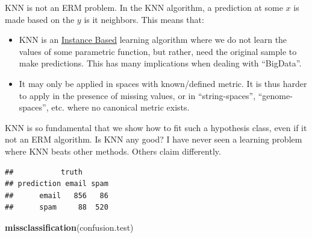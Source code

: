 \documentclass[]{book}
\newenvironment{Shaded}{\begin{snugshade}}{\end{snugshade}}
\newcommand{\KeywordTok}[1]{\textcolor[rgb]{0.13,0.29,0.53}{\textbf{#1}}}
\newcommand{\DataTypeTok}[1]{\textcolor[rgb]{0.13,0.29,0.53}{#1}}
\newcommand{\DecValTok}[1]{\textcolor[rgb]{0.00,0.00,0.81}{#1}}
\newcommand{\StringTok}[1]{\textcolor[rgb]{0.31,0.60,0.02}{#1}}
\newcommand{\CommentTok}[1]{\textcolor[rgb]{0.56,0.35,0.01}{\textit{#1}}}
\newcommand{\OperatorTok}[1]{\textcolor[rgb]{0.81,0.36,0.00}{\textbf{#1}}}
\newcommand{\NormalTok}[1]{#1}
\providecommand{\tightlist}{%
  \setlength{\itemsep}{0pt}\setlength{\parskip}{0pt}}
\theoremstyle{definition}
\theoremstyle{definition}
\theoremstyle{definition}
\theoremstyle{remark}
\begin{document}
KNN is not an ERM problem. In the KNN algorithm, a prediction at some
\(x\) is made based on the \(y\) is it neighbors. This means that:

\begin{itemize}
\tightlist
\item
  KNN is an
  \href{https://en.wikipedia.org/wiki/Instance-based_learning}{Instance
  Based} learning algorithm where we do not learn the values of some
  parametric function, but rather, need the original sample to make
  predictions. This has many implications when dealing with ``BigData''.
\item
  It may only be applied in spaces with known/defined metric. It is thus
  harder to apply in the presence of missing values, or in
  ``string-spaces'', ``genome-spaces'', etc. where no canonical metric
  exists.
\end{itemize}

KNN is so fundamental that we show how to fit such a hypothesis class,
even if it not an ERM algorithm. Is KNN any good? I have never seen a
learning problem where KNN beats other methods. Others claim
differently.

\begin{Shaded}
\end{Shaded}

\begin{verbatim}
##           truth
## prediction email spam
##      email   856   86
##      spam     88  520
\end{verbatim}

\begin{Shaded}
\begin{Highlighting}[]
\KeywordTok{missclassification}\NormalTok{(confusion.test)}
\end{Highlighting}
\end{Shaded}
\end{document}
